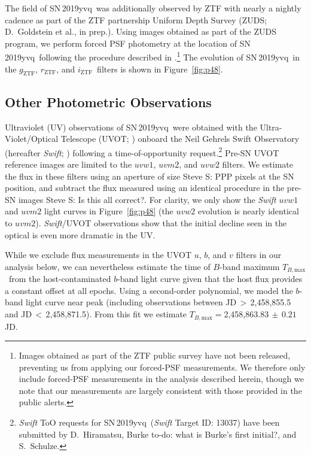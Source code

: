 \documentclass[twocolumn]{aastex63}
\newcommand{\steve}[1]{{\color{Blueberry} Steve S: {#1}}}
\newcommand{\todo}[1]{{\color{magenta} to-do: {#1}}}
\newcommand{\rztf}{$r_\mathrm{ZTF}$}
\newcommand{\gztf}{$g_\mathrm{ZTF}$}
\newcommand{\iztf}{$i_\mathrm{ZTF}$}
\newcommand{\tbmax}{$T_{B,\mathrm{max}}$}
\newcommand{\sn}{SN\,2019yvq}
\begin{document}
The field of \sn\ was additionally observed by ZTF with nearly a nightly
cadence as part of the ZTF partnership Uniform Depth Survey (ZUDS;
D.~Goldstein et al., in prep.). Using images obtained as part of the ZUDS
program, we perform forced PSF photometry at the location of \sn\ following
the procedure described in \citet{Yao19}.\footnote{Images obtained as part of
the ZTF public survey have not been released, preventing us from applying our
forced-PSF measurements. We therefore only include forced-PSF measurements in
the analysis described herein, though we note that our measurements are
largely consistent with those provided in the public alerts.} The evolution
of \sn\ in the \gztf, \rztf, and \iztf\ filters is shown in
Figure~\ref{fig:p48}.

\subsection{Other Photometric Observations}

Ultraviolet (UV) observations of \sn\ were obtained with the
Ultra-Violet/Optical Telescope (UVOT; \citet{Roming05}) onboard the Neil
Gehrels Swift Observatory (hereafter \textit{Swift}; \citealt{Gehrels04})
following a time-of-opportunity request.\footnote{\textit{Swift} ToO requests
for \sn\ (\textit{Swift} Target ID: 13037) have been submitted by
D.~Hiramatsu, Burke \todo{what is Burke's first initial?}, and S.~Schulze.}
Pre-SN UVOT reference images are limited to the $uvw1$, $uvm2$, and $uvw2$
filters. We estimate the flux in these filters using an aperture of size
\steve{PPP} pixels at the SN position, and subtract the flux measured using
an identical procedure in the pre-SN images \steve{Is this all correct?}. For
clarity, we only show the \textit{Swift} $uvw1$ and $uvm2$ light curves in
Figure~\ref{fig:p48} (the $uvw2$ evolution is nearly identical to $uvm2$).
\textit{Swift}/UVOT observations show that the initial decline seen in the
optical is even more dramatic in the UV.

While we exclude flux measurements in the UVOT $u$, $b$, and $v$ filters in
our analysis below, we can nevertheless estimate the time of $B$-band maximum
\tbmax\ from the host-contaminated $b$-band light curve given that the host
flux provides a constant offset at all epochs. Using a second-order
polynomial, we model the $b$-band light curve near peak (including
observations between JD$\,> \,$2,458,855.5 and JD$\,<\,$2,458,871.5). From
this fit we estimate \tbmax$ = $2,458,863.83$ \,\pm \,0.21$\,JD.
\end{document}
